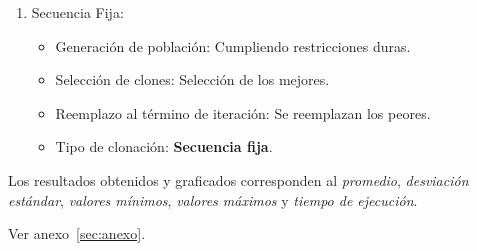 \begin{enumerate}
    \item Secuencia Fija:

        \begin{itemize}
            \item Generación de población: Cumpliendo restricciones duras.
            \item Selección de clones: Selección de los mejores.
            \item Reemplazo al término de iteración:  Se reemplazan los peores.
            \item Tipo de clonación: \textbf{Secuencia fija}.
        \end{itemize}

\end{enumerate}

Los resultados obtenidos y graficados corresponden al \emph{promedio}, \emph{desviación estándar},
\emph{valores mínimos}, \emph{valores máximos} y \emph{tiempo de ejecución}.


Ver anexo~\ref{sec:anexo}.

